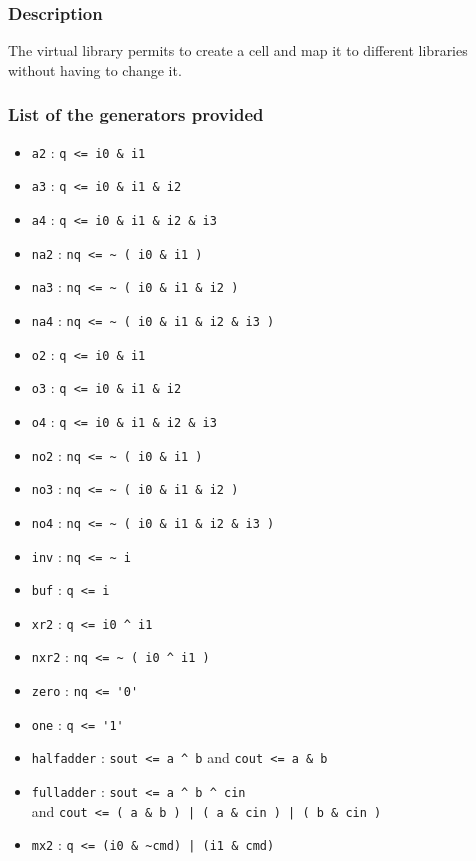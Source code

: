 \subsubsection{Description}

The virtual library permits to create a cell and map it to different libraries without having to change it.
    
\subsubsection{List of the generators provided}

\begin{itemize}
    \item \verb-a2- : \verb-q <= i0 & i1-
    \item \verb-a3- : \verb-q <= i0 & i1 & i2-
    \item \verb-a4- : \verb-q <= i0 & i1 & i2 & i3-
    \item \verb-na2- : \verb-nq <= ~ ( i0 & i1 )-
    \item \verb-na3- : \verb-nq <= ~ ( i0 & i1 & i2 )-
    \item \verb-na4- : \verb-nq <= ~ ( i0 & i1 & i2 & i3 )-
    \item \verb-o2- : \verb-q <= i0 & i1-
    \item \verb-o3- : \verb-q <= i0 & i1 & i2-
    \item \verb-o4- : \verb-q <= i0 & i1 & i2 & i3-
    \item \verb-no2- : \verb-nq <= ~ ( i0 & i1 )-
    \item \verb-no3- : \verb-nq <= ~ ( i0 & i1 & i2 )-
    \item \verb-no4- : \verb-nq <= ~ ( i0 & i1 & i2 & i3 )-
    \item \verb-inv- : \verb-nq <= ~ i-
    \item \verb-buf- : \verb-q <= i-
    \item \verb-xr2- : \verb-q <= i0 ^ i1-
    \item \verb-nxr2- : \verb-nq <= ~ ( i0 ^ i1 )-
    \item \verb-zero- : \verb-nq <= '0'-
    \item \verb-one- : \verb-q <= '1'-
    \item \verb-halfadder- : \verb-sout <= a ^ b- and \verb-cout <= a & b-
    \item \verb-fulladder- : \verb-sout <= a ^ b ^ cin-\\\indent and \verb-cout <= ( a & b ) | ( a & cin ) | ( b & cin )-
    \item \verb-mx2- : \verb-q <= (i0 & ~cmd) | (i1 & cmd)-

\end{itemize}
